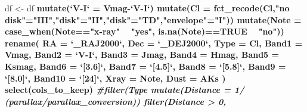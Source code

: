 \documentclass[]{article}
\newenvironment{Shaded}{\begin{snugshade}}{\end{snugshade}}
\newcommand{\CommentTok}[1]{\textcolor[rgb]{0.56,0.35,0.01}{\textit{#1}}}
\newcommand{\DataTypeTok}[1]{\textcolor[rgb]{0.13,0.29,0.53}{#1}}
\newcommand{\DecValTok}[1]{\textcolor[rgb]{0.00,0.00,0.81}{#1}}
\newcommand{\KeywordTok}[1]{\textcolor[rgb]{0.13,0.29,0.53}{\textbf{#1}}}
\newcommand{\NormalTok}[1]{#1}
\newcommand{\OperatorTok}[1]{\textcolor[rgb]{0.81,0.36,0.00}{\textbf{#1}}}
\newcommand{\OtherTok}[1]{\textcolor[rgb]{0.56,0.35,0.01}{#1}}
\newcommand{\StringTok}[1]{\textcolor[rgb]{0.31,0.60,0.02}{#1}}
\begin{document}
\begin{Shaded}
\begin{Highlighting}[]
\NormalTok{df <-}\StringTok{ }\NormalTok{df }\OperatorTok{%>%}
\StringTok{  }\KeywordTok{mutate}\NormalTok{(}\StringTok{`}\DataTypeTok{V-I}\StringTok{`}\NormalTok{ =}\StringTok{ }\NormalTok{Vmag}\OperatorTok{-}\StringTok{`}\DataTypeTok{V-I}\StringTok{`}\NormalTok{) }\OperatorTok{%>%}\StringTok{ }
\StringTok{  }\KeywordTok{mutate}\NormalTok{(}\DataTypeTok{Cl =} \KeywordTok{fct_recode}\NormalTok{(Cl,}\StringTok{"no disk"}\NormalTok{=}\StringTok{"III"}\NormalTok{,}\StringTok{"disk"}\NormalTok{=}\StringTok{"II"}\NormalTok{,}\StringTok{"disk"}\NormalTok{=}\StringTok{"TD"}\NormalTok{,}\StringTok{"envelope"}\NormalTok{=}\StringTok{"I"}\NormalTok{)) }\OperatorTok{%>%}\StringTok{ }
\StringTok{  }\KeywordTok{mutate}\NormalTok{(}\DataTypeTok{Note =} \KeywordTok{case_when}\NormalTok{(Note}\OperatorTok{==}\StringTok{"x-ray"} \OperatorTok{~}\StringTok{ "yes"}\NormalTok{,}
                            \KeywordTok{is.na}\NormalTok{(Note)}\OperatorTok{==}\OtherTok{TRUE} \OperatorTok{~}\StringTok{ "no"}\NormalTok{)) }\OperatorTok{%>%}\StringTok{ }
\StringTok{  }\KeywordTok{rename}\NormalTok{(}
    \DataTypeTok{RA =} \StringTok{`}\DataTypeTok{_RAJ2000}\StringTok{`}\NormalTok{,}
    \DataTypeTok{Dec =} \StringTok{`}\DataTypeTok{_DEJ2000}\StringTok{`}\NormalTok{,}
    \DataTypeTok{Type =}\NormalTok{ Cl,}
    \DataTypeTok{Band1 =}\NormalTok{ Vmag,}
    \DataTypeTok{Band2 =} \StringTok{`}\DataTypeTok{V-I}\StringTok{`}\NormalTok{,}
    \DataTypeTok{Band3 =}\NormalTok{ Jmag,}
    \DataTypeTok{Band4 =}\NormalTok{ Hmag,}
    \DataTypeTok{Band5 =}\NormalTok{ Ksmag,}
    \DataTypeTok{Band6 =} \StringTok{`}\DataTypeTok{[3.6]}\StringTok{`}\NormalTok{,}
    \DataTypeTok{Band7 =} \StringTok{`}\DataTypeTok{[4.5]}\StringTok{`}\NormalTok{,}
    \DataTypeTok{Band8 =} \StringTok{`}\DataTypeTok{[5.8]}\StringTok{`}\NormalTok{,}
    \DataTypeTok{Band9 =} \StringTok{`}\DataTypeTok{[8.0]}\StringTok{`}\NormalTok{,}
    \DataTypeTok{Band10 =} \StringTok{`}\DataTypeTok{[24]}\StringTok{`}\NormalTok{,}
    \DataTypeTok{Xray =}\NormalTok{ Note,}
    \DataTypeTok{Dust =}\NormalTok{ AKs}
\NormalTok{  ) }\OperatorTok{%>%}\StringTok{ }
\StringTok{  }\KeywordTok{select}\NormalTok{(cols_to_keep) }\OperatorTok{%>%}\StringTok{ }
\StringTok{  }\CommentTok{#filter(Type %in% c("Disk","No Disk")) %>% }
\StringTok{  }\KeywordTok{mutate}\NormalTok{(}\DataTypeTok{Distance =} \DecValTok{1}\OperatorTok{/}\StringTok{ }\NormalTok{(parallax}\OperatorTok{/}\NormalTok{parallax_conversion)) }\OperatorTok{%>%}\StringTok{ }
\StringTok{  }\KeywordTok{filter}\NormalTok{(Distance }\OperatorTok{>}\StringTok{ }\DecValTok{0}\NormalTok{,}
}}}}}}}}
\end{Highlighting}
\end{Shaded}
\end{document}
